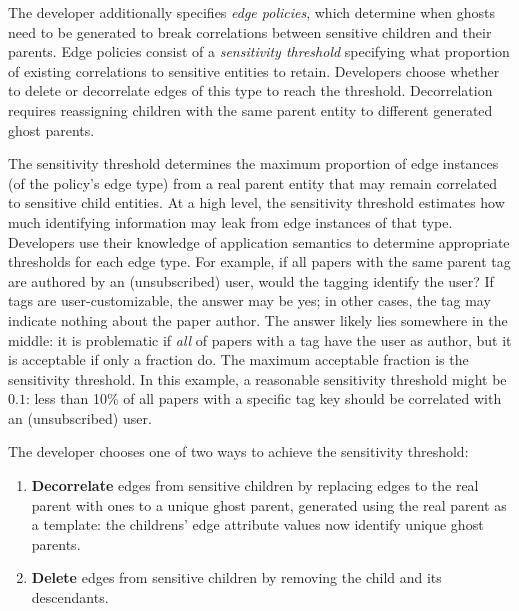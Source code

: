 The developer additionally specifies \emph{edge policies}, which determine when ghosts need to be
generated to break correlations between sensitive children and their parents.
Edge policies consist of a \emph{sensitivity threshold} specifying what
proportion of existing correlations to sensitive entities to retain. Developers choose
whether to delete or decorrelate edges of this type to reach the threshold. Decorrelation requires
reassigning children with the same parent entity to different generated ghost parents.

The sensitivity threshold determines the maximum proportion of edge instances (of the policy's edge
type) from a real parent entity that may remain correlated to sensitive child entities.
At a high level, the sensitivity threshold estimates how much identifying information may leak from
edge instances of that type.  Developers use their knowledge of application semantics to determine
appropriate thresholds for each edge type. 
For example, if all papers with the same parent tag are authored by an (unsubscribed) user, would
the tagging identify the user? If tags are user-customizable, the answer may be yes; in other cases, the tag
may indicate nothing about the paper author. The answer likely lies somewhere in the middle: it is
problematic if \emph{all} of papers with a tag have the user as author, but it is acceptable if only
a fraction do.  The maximum acceptable fraction is the sensitivity threshold. In this example, a
reasonable sensitivity threshold might be $0.1$: less than 10\% of all papers with a specific tag
key should be correlated with an (unsubscribed) user. 

The developer chooses one of two ways to achieve the sensitivity threshold: 
\begin{enumerate}
    \item \textbf{Decorrelate} edges from sensitive children by replacing edges to the real parent with
        ones to a unique ghost parent, generated using the real parent as a template:
        the childrens' edge attribute values now identify unique ghost parents. 

\item \textbf{Delete} edges from sensitive children by removing the child and its descendants. 
\end{enumerate}

